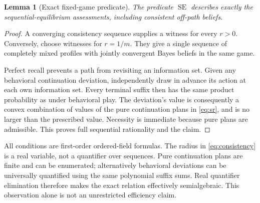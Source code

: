 \documentclass[11pt,a4paper]{article}
\numberwithin{equation}{section}
\newtheorem{lemma}[theorem]{Lemma}
\theoremstyle{definition}
\DeclareMathOperator{\SE}{SE}
\begin{document}
\begin{lemma}[Exact fixed-game predicate]\label{lem:exactse}
The predicate \(\SE\) describes exactly the sequential-equilibrium
assessments, including consistent off-path beliefs.
\end{lemma}
\begin{proof}
A converging consistency sequence supplies a witness for every \(r>0\).
Conversely, choose witnesses for \(r=1/m\). They give a single sequence
of completely mixed profiles with jointly convergent Bayes beliefs
in the same game.

Perfect recall prevents a path from revisiting an information set.
Given any behavioral continuation deviation, independently draw in
advance its action at each own information set. Every terminal suffix
then has the same product probability as under behavioral play.
The deviation's value is consequently a convex combination of values
of the pure continuation plans in \eqref{eq:sr}, and is no larger
than the prescribed value. Necessity is immediate because pure plans
are admissible. This proves full sequential rationality and the claim.
\end{proof}

All conditions are first-order ordered-field formulas. The radius
in \eqref{eq:consistency} is a real variable, not a quantifier over
sequences. Pure continuation plans are finite and can be enumerated;
alternatively behavioral deviations can be universally quantified using
the same polynomial suffix sums. Real quantifier elimination therefore
makes the exact relation effectively semialgebraic. This observation
alone is not an unrestricted efficiency claim.
\end{document}

